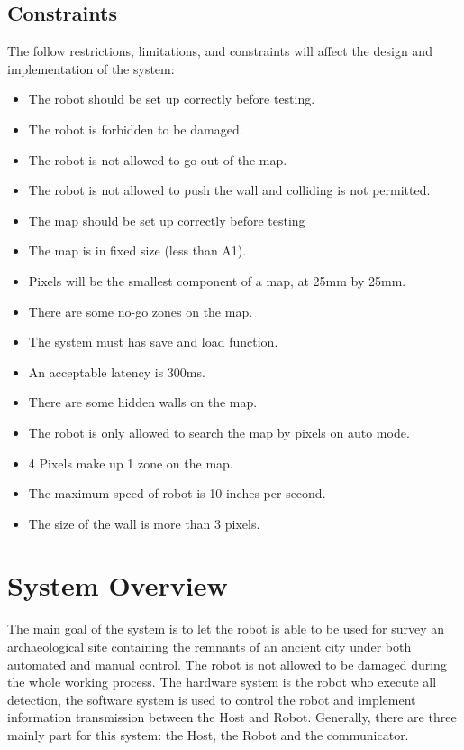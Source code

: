 \documentclass[11pt, a4paper]{report}
\begin{document}
\section{Constraints}
The follow restrictions, limitations, and constraints will affect the design and implementation of the system:
\begin{itemize}
  \item The robot should be set up correctly before testing.
  \item The robot is forbidden to be damaged.
  \item The robot is not allowed to go out of the map.
  \item The robot is not allowed to push the wall and colliding is not permitted.
  \item The map should be set up correctly before testing
  \item The map is in fixed size (less than A1).
  \item Pixels will be the smallest component of a map, at 25mm by 25mm.
  \item There are some no-go zones on the map.
  \item The system must has save and load function.
  \item An acceptable latency is 300ms.
  \item There are some hidden walls on the map.
  \item The robot is only allowed to  search the map by pixels on auto mode.
  \item 4 Pixels make up 1 zone on the map.
  \item The maximum speed of robot is 10 inches per second.
  \item The size of the wall is more than 3 pixels.
\end{itemize}


\pagebreak


\chapter{System Overview}%
The main goal of the system is to let the robot is able to be used for survey an archaeological site containing the remnants of an ancient city under both automated and manual control.  The robot is not allowed to be damaged during the whole working process. The hardware system is the robot who execute all detection, the software system is used to control the robot and implement information transmission between the Host and Robot. Generally, there are three mainly part for this system: the Host, the Robot and the communicator.  
\end{document}
